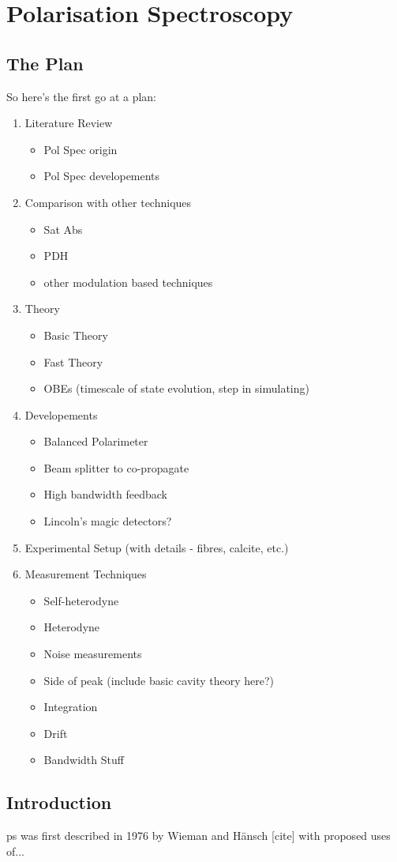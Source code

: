 \chapter{Polarisation Spectroscopy}

\section{The Plan}
So here's the first go at a plan:
\begin{enumerate}
    \item Literature Review
    \begin{itemize}
        \item Pol Spec origin
        \item Pol Spec developements
    \end{itemize}
    \item Comparison with other techniques
    \begin{itemize}
        \item Sat Abs
        \item PDH
        \item other modulation based techniques
    \end{itemize}
    \item Theory
    \begin{itemize}
        \item Basic Theory
        \item Fast Theory
        \item OBEs (timescale of state evolution, step in simulating)
    \end{itemize}
    \item Developements
    \begin{itemize}
        \item Balanced Polarimeter
        \item Beam splitter to co-propagate
        \item High bandwidth feedback
        \item Lincoln's magic detectors?
    \end{itemize}
    \item Experimental Setup (with details - fibres, calcite, etc.)
    \item Measurement Techniques
    \begin{itemize}
        \item Self-heterodyne
        \item Heterodyne
        \item Noise measurements
        \item Side of peak (include basic cavity theory here?)
        \item Integration
        \item Drift
        \item Bandwidth Stuff
    \end{itemize}
\end{enumerate}

\section{Introduction}

\Gls{ps} was first described in 1976 by Wieman and Hänsch [cite] with proposed uses of...

